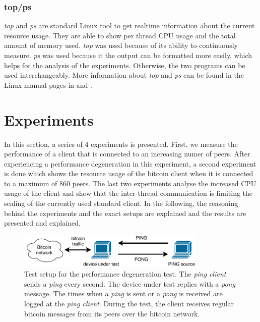 \subsubsection{top/ps}
\textit{top} and \textit{ps} are standard Linux tool to get realtime information about the current resource usage. They are able to show per thread CPU usage and the total amount of memory used. \textit{top} was used because of its ability to continuously measure. \textit{ps} was used because it the output can be formatted more easily, which helps for the analysis of the experiments. Otherwise, the two programs can be used interchangeably. More information about \textit{top} and \textit{ps} can be found in the Linux manual pages in \cite{top} and \cite{ps}. 




\section{\label{profiling:results}Experiments}
In this section, a series of 4 experiments is presented. First, we measure the performance of a client that is connected to an increasing numer of peers. After experiencing a performance degeneration in this experiment, a second experiment is done which shows the resource usage of the bitcoin client when it is connected to a maximum of 860 peers. The last two experiments analyse the increased CPU usage of the client and show that the inter-thread communication is limiting the scaling of the currently used standard client. In the following, the reasoning behind the experiments and the exact setups are explained and the results are presented and explained.

\begin{figure}[!bt]
\begin{center}
\includegraphics[width=0.8\textwidth]{Figures/pingmachine.pdf}
\caption[Test setup for the performance degeneration test]{Test setup for the performance degeneration test. The \textit{ping client} sends a \textit{ping} every second. The device under test replies with a \textit{pong} message. The times when a \textit{ping} is sent or a \textit{pong} is received are logged at the \textit{ping client}. During the test, the client receives regular bitcoin messages from its peers over the bitcoin network. \label{figure:pingmachine}}
\end{center}
\end{figure}

